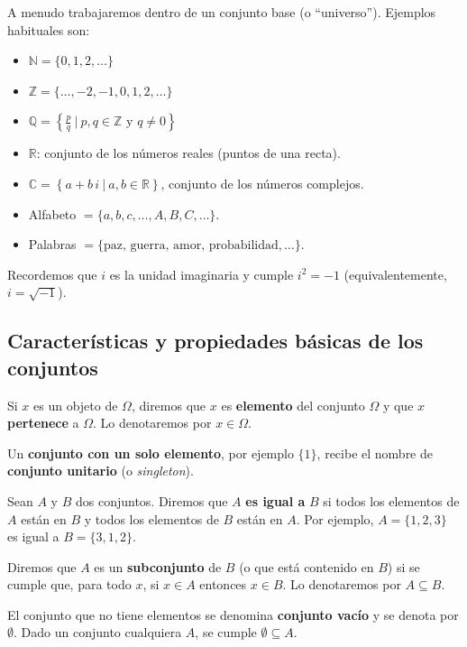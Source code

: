 \documentclass[
  letterpaper,
  DIV=11,
  numbers=noendperiod]{scrreprt}
\begin{document}
A menudo trabajaremos dentro de un conjunto base (o ``universo'').
Ejemplos habituales son:

\begin{itemize}
\item
  \(\mathbb{N}=\{0,1,2,\ldots\}\)
\item
  \(\mathbb{Z}=\{\ldots,-2,-1,0,1,2,\ldots\}\)
\item
  \(\mathbb{Q}=\left\{\frac{p}{q}\ \Big|\ p,q\in \mathbb{Z} \text{ y } q \neq 0\right\}\)
\item
  \(\mathbb{R}\): conjunto de los números reales (puntos de una recta).
\item
  \(\mathbb{C}= \left\{a+b\, i\ \big|\ a,b\in \mathbb{R}\right\}\),
  conjunto de los números complejos.
\item
  Alfabeto \(=\{a,b,c,\ldots, A,B,C,\ldots\}\).
\item
  Palabras \(=\{\text{paz, guerra, amor, probabilidad},\ldots\}\).
\end{itemize}

Recordemos que \(i\) es la unidad imaginaria y cumple \(i^2=-1\)
(equivalentemente, \(i=\sqrt{-1}\)).

\subsection{Características y propiedades básicas de los
conjuntos}\label{caracteruxedsticas-y-propiedades-buxe1sicas-de-los-conjuntos}

Si \(x\) es un objeto de \(\Omega\), diremos que \(x\) es
\textbf{elemento} del conjunto \(\Omega\) y que \(x\) \textbf{pertenece}
a \(\Omega\). Lo denotaremos por \(x\in \Omega\).

Un \textbf{conjunto con un solo elemento}, por ejemplo \(\{1\}\), recibe
el nombre de \textbf{conjunto unitario} (o \emph{singleton}).

Sean \(A\) y \(B\) dos conjuntos. Diremos que \(A\) \textbf{es igual a}
\(B\) si todos los elementos de \(A\) están en \(B\) y todos los
elementos de \(B\) están en \(A\). Por ejemplo, \(A=\{1,2,3\}\) es igual
a \(B=\{3,1,2\}\).

Diremos que \(A\) es un \textbf{subconjunto} de \(B\) (o que está
contenido en \(B\)) si se cumple que, para todo \(x\), si \(x\in A\)
entonces \(x\in B\). Lo denotaremos por \(A\subseteq B\).

El conjunto que no tiene elementos se denomina \textbf{conjunto vacío} y
se denota por \(\emptyset\). Dado un conjunto cualquiera \(A\), se
cumple \(\emptyset\subseteq A\).
\end{document}
